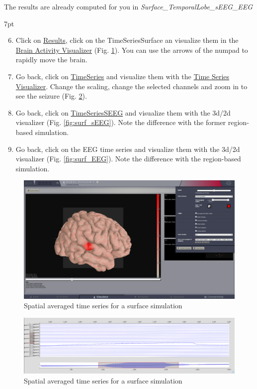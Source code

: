 \documentclass{tufte-handout}
\newenvironment{simulation}{%
  \def\FrameCommand{%
    \hspace{1pt}%
    {\color{ForestGreen}\vrule width 2pt}%
    {\color{simulationshade}\vrule width 4pt}%
    \colorbox{simulationshade}%
  }%
  \MakeFramed{\advance\hsize-\width\FrameRestore}%
  \noindent\hspace{-4.55pt}%
  \begin{adjustwidth}{}{7pt}%
  \vspace{2pt}\vspace{2pt}%
}
{%
  \vspace{2pt}\end{adjustwidth}\endMakeFramed%
}
\begin{document}
  The results are already computed for you in \textit{Surface\_TemporalLobe\_sEEG\_EEG}
 \begin{simulation}
  \begin{enumerate}
     \setcounter{enumi}{5}
  \item Click on \underline{Results}, click on the TimeSeriesSurface an visualize them in the 
  \underline{Brain Activity Visualizer} (Fig. \ref{fig:bv_surf}). You can use the arrows of the numpad to rapidly 
  move the brain.
  \item Go back,  click on \underline{TimeSeries} and visualize them with the \underline{Time Series Visualizer}. Change the scaling, change the selected channels and zoom in to see
  the seizure (Fig. \ref{fig:ts_surf}).
  \item Go back, click on \underline{TimeSeriesSEEG} and visualize them with the 3d/2d visualizer (Fig. \ref{fig:surf_sEEG}).
  Note the difference with the former region-based simulation.
  \item Go back, click on the EEG time series and visualize them with the 3d/2d visualizer (Fig. \ref{fig:surf_EEG}).
  Note the difference with the region-based simulation.
\end{enumerate}
\end{simulation}

\begin{figure}[h]
  \includegraphics[width=\linewidth]{Handout_UI_ModellingAnEpilepticPatient_TemporalAverageTimeSeriesSurface}%
  \caption{Spatial averaged time series for a surface simulation}%
  \label{fig:bv_surf}%
\end{figure}

\begin{figure}[h]
  \includegraphics[width=\linewidth]{Handout_UI_ModellingAnEpilepticPatient_SpatialAverageTimeSeries}%
  \caption{Spatial averaged time series for a surface simulation}%
  \label{fig:ts_surf}%
\end{figure}
\end{document}
